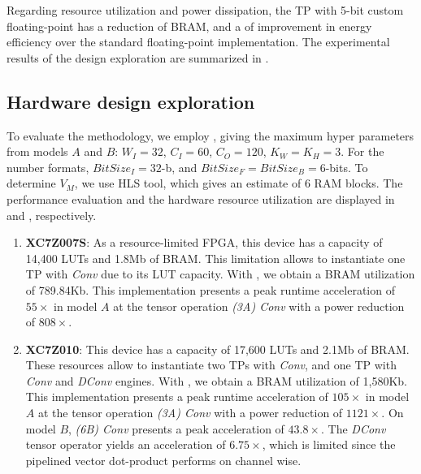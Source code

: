 Regarding resource utilization and power dissipation, the TP with 5-bit custom floating-point has a  reduction of BRAM, and a  of improvement in energy efficiency over the standard floating-point implementation.  The experimental results of the design exploration are summarized in . 


\subsection{Hardware design exploration}
To evaluate the methodology, we employ , giving the maximum hyper parameters from models $A$ and $B$: $W_{I}=32$, $C_{I}=60$, $C_{O}=120$, $K_{W} = K_{H} =3$. For the number formats, $BitSize_{I}=32$-b, and $BitSize_{F} = BitSize_{B}=6$-bits. To determine $V_{M}$, we use HLS tool, which gives an estimate of 6 RAM blocks. The performance evaluation and the hardware resource utilization are displayed in  and , respectively.

\begin{enumerate}
\item{\textbf{XC7Z007S}}: As a resource-limited FPGA, this device has a capacity of 14,400 LUTs and 1.8Mb of BRAM. This limitation allows to instantiate one TP with \emph{Conv} due to its LUT capacity. With , we obtain a BRAM utilization of 789.84Kb. This implementation presents a peak runtime acceleration of $55\times$ in model $A$ at the tensor operation \emph{(3A) Conv} with a power reduction of $808\times$.

\item{\textbf{XC7Z010}}: This device has a capacity of 17,600 LUTs and 2.1Mb of BRAM. These resources allow to instantiate two TPs with \emph{Conv}, and one TP with \emph{Conv} and \emph{DConv} engines. With , we obtain a BRAM utilization of 1,580Kb. This implementation presents a peak runtime acceleration of $105\times$ in model $A$ at the tensor operation \emph{(3A) Conv} with a power reduction of $1121\times$. On model $B$, \emph{(6B) Conv} presents a peak acceleration of $43.8\times$. The \emph{DConv} tensor operator yields an acceleration of $6.75 \times$, which is limited since the pipelined vector dot-product performs on channel wise.
\end{enumerate}

